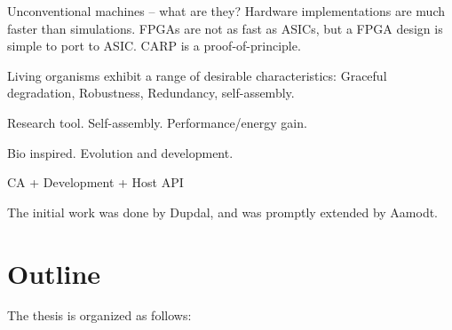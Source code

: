 \TODO
Unconventional machines – what are they?
Hardware implementations are much faster than simulations.
FPGAs are not as fast as ASICs, but a FPGA design is simple to port to ASIC.
CARP is a proof-of-principle.

Living organisms exhibit a range of desirable characteristics:
Graceful degradation, Robustness, Redundancy, self-assembly.

Research tool.
Self-assembly.
Performance/energy gain.

Bio inspired.
Evolution and development.

CA + Development + Host API


The initial work was done by Dupdal, and was promptly extended by Aamodt.


\section{Outline}

The thesis is organized as follows:

